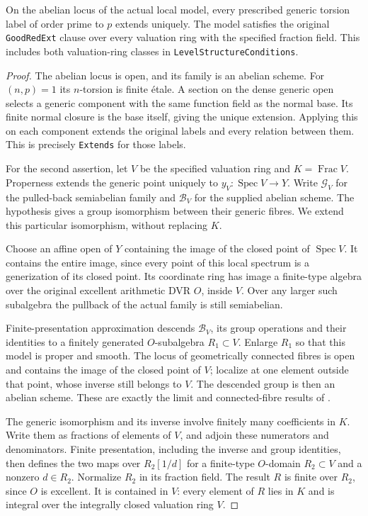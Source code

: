 \begin{proposition}
\label{prop:pel-prime-to-p-and-dvr-extension}
On the abelian locus of the actual local model, every prescribed
generic torsion label of order prime to $p$ extends uniquely.
The model satisfies the original \texttt{GoodRedExt} clause over
every valuation ring with the specified fraction field.  This
includes both valuation-ring classes in
\texttt{LevelStructureConditions}.
\end{proposition}
\begin{proof}
The abelian locus is open, and its family is an abelian scheme.
For $(n,p)=1$ its $n$-torsion is finite \'etale.  A section on the
dense generic open selects a generic component with the same
function field as the normal base.  Its finite normal closure is
the base itself, giving the unique extension.  Applying this on
each component extends the original labels and every relation
between them.  This is precisely \texttt{Extends} for those labels.

For the second assertion, let $V$ be the specified valuation
ring and $K=\operatorname{Frac}V$.  Properness extends the generic
point uniquely to $y_V:\operatorname{Spec}V\to Y$.
Write $\mathcal G_V$ for the pulled-back semiabelian family and
$\mathcal B_V$ for the supplied abelian scheme.  The hypothesis
gives a group isomorphism between their generic fibres.  We
extend this particular isomorphism, without replacing $K$.

Choose an affine open of $Y$ containing the image of the closed
point of $\operatorname{Spec}V$.  It contains the entire image,
since every point of this local spectrum is a generization of
its closed point.  Its coordinate ring has image a finite-type
algebra over the original excellent arithmetic DVR $O$, inside
$V$.  Over any larger such subalgebra the pullback of the actual
family is still semiabelian.

Finite-presentation approximation descends $\mathcal B_V$, its
group operations and their identities to a finitely generated
$O$-subalgebra $R_1\subset V$.  Enlarge $R_1$ so that this
model is proper and smooth.  The locus of geometrically
connected fibres is open and contains the image of the closed
point of $V$; localize at one element outside that point, whose
inverse still belongs to $V$.  The descended group is then an
abelian scheme.  These are exactly the limit and connected-fibre
results of \cite{level-symmetry-approximation}.

The generic isomorphism and its inverse involve finitely many
coefficients in $K$.  Write them as fractions of elements of
$V$, and adjoin these numerators and denominators.  Finite
presentation, including the inverse and group identities, then
defines the two maps over $R_2[1/d]$ for a finite-type
$O$-domain $R_2\subset V$ and a nonzero $d\in R_2$.
Normalize $R_2$ in its fraction field.  The result $R$ is finite
over $R_2$, since $O$ is excellent.  It is contained in $V$:
every element of $R$ lies in $K$ and is integral over the
integrally closed valuation ring $V$.


\end{proof}
